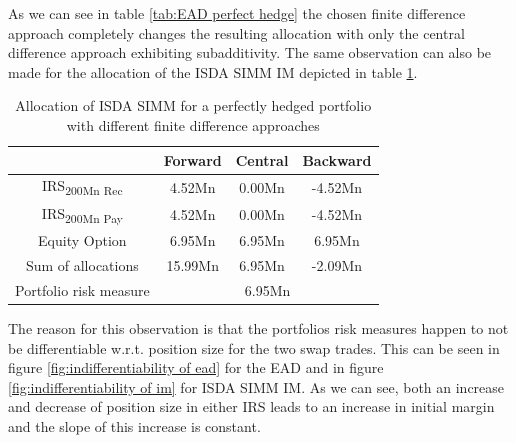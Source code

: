 \documentclass[../Thesis_AHoecherl.tex]{subfiles}
\begin{document}
    As we can see in table \ref{tab:EAD perfect hedge} the chosen finite difference approach completely changes the resulting allocation with only the central difference approach exhibiting subadditivity.
    The same observation can also be made for the allocation of the \gls{ISDA SIMM} \gls{IM} depicted in table \ref{tab:IM perfect hedge}.
    \begin{table}[htbp]
        \centering
        \begin{tabular}{c|c|c|c}
            & Forward & Central & Backward \\
            \toprule
            IRS\textsubscript{200Mn Rec} & 4.52Mn & 0.00Mn & -4.52Mn \\
            \midrule
            IRS\textsubscript{200Mn Pay} & 4.52Mn & 0.00Mn & -4.52Mn \\
            \midrule
            Equity Option & 6.95Mn & 6.95Mn & 6.95Mn \\
            \bottomrule
            Sum of allocations & 15.99Mn & 6.95Mn & -2.09Mn \\
            \midrule
            Portfolio risk measure & \multicolumn{3}{c}{6.95Mn}  \\
        \end{tabular}%
        \caption[Allocation of \gls{ISDA SIMM} for a perfectly hedged portfolio]{Allocation of \gls{ISDA SIMM} for a perfectly hedged portfolio with different finite difference approaches}
        \label{tab:IM perfect hedge}
    \end{table}
    
    The reason for this observation is that the portfolios risk measures happen to not be differentiable w.r.t. position size for the two swap trades. This can be seen in figure \ref{fig:indifferentiability of ead} for the \gls{EAD} and in figure \ref{fig:indifferentiability of im} for \gls{ISDA SIMM} \gls{IM}.
    As we can see, both an increase and decrease of position size in either \gls{IRS} leads to an increase in initial margin and the slope of this increase is constant.
    
    
\end{document}
